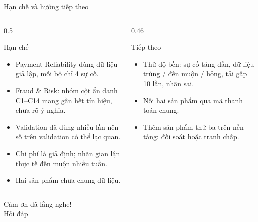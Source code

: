 \documentclass[aspectratio=169,11pt]{beamer}
\begin{document}
\begin{frame}{Hạn chế và hướng tiếp theo}
  \begin{columns}[T]
    \begin{column}{0.5\textwidth}
      \begin{alertblock}{Hạn chế}\footnotesize
        \begin{itemize}
          \item Payment Reliability dùng dữ liệu giả lập, mỗi bộ chỉ 4 sự cố.
          \item Fraud \& Risk: nhóm cột ẩn danh C1–C14 mang gần hết tín hiệu, chưa rõ ý nghĩa.
          \item Validation đã dùng nhiều lần nên số trên validation có thể lạc quan.
          \item Chi phí là giả định; nhãn gian lận thực tế đến muộn nhiều tuần.
          \item Hai sản phẩm chưa chung dữ liệu.
        \end{itemize}
      \end{alertblock}
    \end{column}
    \begin{column}{0.46\textwidth}
      \begin{block}{Tiếp theo}\footnotesize
        \begin{itemize}
          \item Thử độ bền: sự cố tăng dần, dữ liệu trùng / đến muộn / hỏng, tải gấp 10 lần, nhãn sai.
          \item Nối hai sản phẩm qua mã thanh toán chung.
          \item Thêm sản phẩm thứ ba trên nền tảng: đối soát hoặc tranh chấp.
        \end{itemize}
      \end{block}
    \end{column}
  \end{columns}
\end{frame}

\begin{frame}[standout]
  Cảm ơn đã lắng nghe!\\[4mm]
  {\normalsize Hỏi đáp}
\end{frame}
\end{document}
